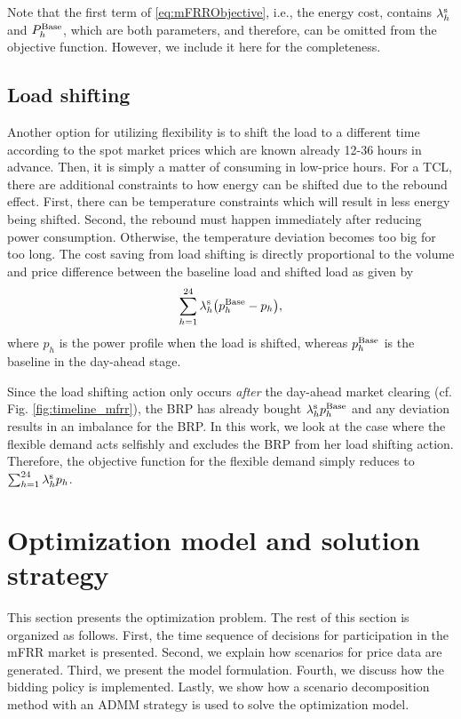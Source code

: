 \documentclass[11pt,a4paper]{article}
\begin{document}
Note that the first term of \eqref{eq:mFRRObjective}, i.e., the energy cost, contains $\lambda^{\rm{s}}_{h}$ and $P^{\rm{Base}}_{h}$, which are both parameters, and therefore, can be omitted from the objective function. However, we include it here for the completeness.

\subsection{Load shifting}
%
Another option for utilizing flexibility is to shift the load to a different time according to the spot market prices which are known already 12-36 hours in advance. Then, it is simply a matter of consuming in low-price hours.
%
For a TCL, there are additional constraints to how energy can be shifted due to the rebound effect. First, there can be temperature constraints which will result in less energy being shifted. Second, the rebound must happen immediately after reducing power consumption. Otherwise, the temperature deviation becomes too big for too long.
The cost saving from load shifting is directly proportional to the volume and price difference between the baseline load and shifted load as given by
%
\begin{equation}\label{eq:load_shifting_savings}
    \sum_{h=1}^{24} \lambda^{\rm{s}}_{h} \big(p^{\rm{Base}}_{h} -  p_{h}\big),
\end{equation}
%
where $p_{h}$ is the power profile when the load is shifted, whereas $p^{\rm{Base}}_{h}$ is the baseline in the day-ahead stage.

Since the load shifting action only occurs \textit{after} the day-ahead market clearing (cf. Fig. \ref{fig:timeline_mfrr}), the BRP has already bought $\lambda^{\rm{s}}_{h} p^{\rm{Base}}_{h}$ and any deviation results in an imbalance for the BRP. In this work, we look at the case where the flexible demand acts selfishly and excludes the BRP from her load shifting action. Therefore, the objective function for the flexible demand simply reduces to $\sum_{h=1}^{24} \lambda_{h}^{\rm{s}} p_{h}$.


\section{Optimization model and solution strategy}\label{sec:OptimizationModel}

This section presents the optimization problem. The rest of this section is organized as follows. First, the time sequence of decisions for participation in the mFRR market is presented. Second, we explain how scenarios for price data are generated. Third, we present the model formulation. Fourth, we discuss how the bidding policy is implemented. Lastly, we show how a scenario decomposition method with an ADMM strategy is used to solve the optimization model.
\end{document}
